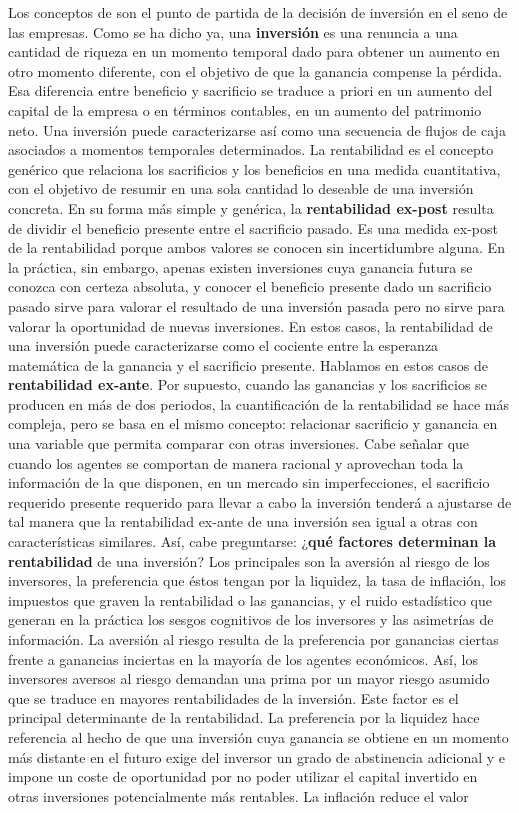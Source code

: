 \documentclass{nuevotema}
\begin{document}
Los conceptos de  son el punto de partida de la decisión de inversión en el seno de las empresas. Como se ha dicho ya, una \textbf{inversión} es una renuncia a una cantidad de riqueza en un momento temporal dado para obtener un aumento en otro momento diferente, con el objetivo de que la ganancia compense la pérdida. Esa diferencia entre beneficio y sacrificio se traduce a priori en un aumento del capital de la empresa o en términos contables, en un aumento del patrimonio neto. Una inversión puede caracterizarse así como una secuencia de flujos de caja asociados a momentos temporales determinados. La rentabilidad es el concepto genérico que relaciona los sacrificios y los beneficios en una medida cuantitativa, con el objetivo de resumir en una sola cantidad lo deseable de una inversión concreta. En su forma más simple y genérica, la \textbf{rentabilidad ex-post} resulta de dividir el beneficio presente entre el sacrificio pasado. Es una medida ex-post de la rentabilidad porque ambos valores se conocen sin incertidumbre alguna. En la práctica, sin embargo, apenas existen inversiones cuya ganancia futura se conozca con certeza absoluta, y conocer el beneficio presente dado un sacrificio pasado sirve para valorar el resultado de una inversión pasada pero no sirve para valorar la oportunidad de nuevas inversiones. En estos casos, la rentabilidad de una inversión puede caracterizarse como el cociente entre la esperanza matemática de la ganancia y el sacrificio presente. Hablamos en estos casos de \textbf{rentabilidad ex-ante}. Por supuesto, cuando las ganancias y los sacrificios se producen en más de dos periodos, la cuantificación de la rentabilidad se hace más compleja, pero se basa en el mismo concepto: relacionar sacrificio y ganancia en una variable que permita comparar con otras inversiones. Cabe señalar que cuando los agentes se comportan de manera racional y aprovechan toda la información de la que disponen, en un mercado sin imperfecciones, el sacrificio requerido presente requerido para llevar a cabo la inversión tenderá a ajustarse de tal manera que la rentabilidad ex-ante de una inversión sea igual a otras con características similares. Así, cabe preguntarse: ¿\textbf{qué factores determinan la rentabilidad} de una inversión? Los principales son la aversión al riesgo de los inversores, la preferencia que éstos tengan por la liquidez, la tasa de inflación, los impuestos que graven la rentabilidad o las ganancias, y el ruido estadístico que generan en la práctica los sesgos cognitivos de los inversores y las asimetrías de información. La aversión al riesgo resulta de la preferencia por ganancias ciertas frente a ganancias inciertas en la mayoría de los agentes económicos. Así, los inversores aversos al riesgo demandan una prima por un mayor riesgo asumido que se traduce en mayores rentabilidades de la inversión. Este factor es el principal determinante de la rentabilidad. La preferencia por la liquidez hace referencia al hecho de que una inversión cuya ganancia se obtiene en un momento más distante en el futuro exige del inversor un grado de abstinencia adicional y e impone un coste de oportunidad por no poder utilizar el capital invertido en otras inversiones potencialmente más rentables. La inflación reduce el valor 
\end{document}

